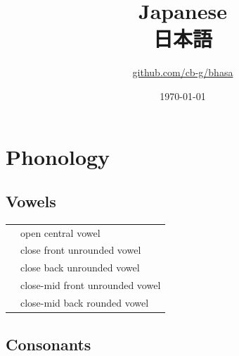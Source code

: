 \documentclass{article}
\title{Japanese\\{\japanesefont 日本語}\\\ipa{[NihoNgo]}}
\author{\href{https://github.com/cb-g/bhasa}{github.com/cb-g/bhasa}}
\date{\today}
\begin{document}
\pagecolor{custom_bg}\color{custom_fg}
\maketitle\thispagestyle{empty}

\newpage\setcounter{page}{1}\section{Phonology}

\subsection{Vowels}

\begin{xltabular}{\textwidth}{lL}
   & open central vowel \\
   & close front unrounded vowel \\
  \ipa{\textturnm} & close back unrounded vowel \\
   & close-mid front unrounded vowel \\
   & close-mid back rounded vowel \\
\end{xltabular}

\subsection{Consonants}
\end{document}
